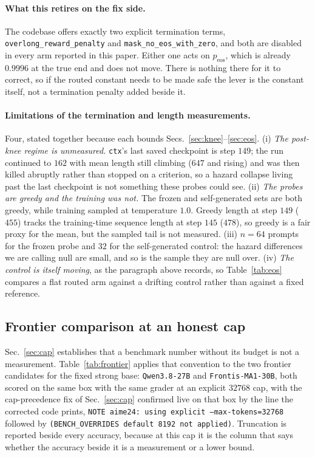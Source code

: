 \paragraph{What this retires on the fix side.} The codebase offers exactly two explicit
termination terms, \texttt{overlong\_reward\_penalty} and
\texttt{mask\_no\_eos\_with\_zero}, and both are disabled in every arm reported in this
paper. Either one acts on $p_{\mathrm{eos}}$,
which is already $0.9996$ at the true end and does not move. There is nothing there for it to
correct, so if the routed constant needs to be made safe the lever is the constant itself, not
a termination penalty added beside it.

\paragraph{Limitations of the termination and length measurements.} Four, stated together
because each bounds Secs.~\ref{sec:knee}--\ref{sec:eos}. (i) \emph{The post-knee regime is
unmeasured.} \texttt{ctx}'s last saved checkpoint is step $149$; the run continued to $162$
with mean length still climbing ($647$ and rising) and was then killed abruptly rather than
stopped on a criterion, so a hazard collapse living past the last checkpoint is not something
these probes could see. (ii) \emph{The probes are greedy and the training was not.} The frozen
and self-generated sets are both greedy, while training sampled at temperature $1.0$. Greedy
length at step $149$ ($455$) tracks the training-time sequence length at step $145$ ($478$),
so greedy is a fair proxy for the mean, but the sampled tail is not measured. (iii) $n = 64$
prompts for the frozen probe and $32$ for the self-generated control: the hazard differences
we are calling null are small, and so is the sample they are null over. (iv) \emph{The control
is itself moving}, as the paragraph above records, so Table~\ref{tab:eos} compares a flat
routed arm against a drifting control rather than against a fixed reference.

\subsection{Frontier comparison at an honest cap}
\label{sec:frontier}

Sec.~\ref{sec:cap} establishes that a benchmark number without its budget is not a
measurement. Table~\ref{tab:frontier} applies that convention to the two frontier candidates
for the fixed strong base: \texttt{Qwen3.8-27B} and \texttt{Frontis-MA1-30B}, both scored on
the same box with the same grader at an explicit $32768$ cap, with the cap-precedence fix of
Sec.~\ref{sec:cap} confirmed live on that box by the line the corrected code prints,
\texttt{NOTE aime24: using explicit --max-tokens=32768} followed by
\texttt{(BENCH\_OVERRIDES default 8192 not applied)}. Truncation is reported beside every
accuracy, because at this cap it is the column that says whether the accuracy beside it is a
measurement or a lower bound.

